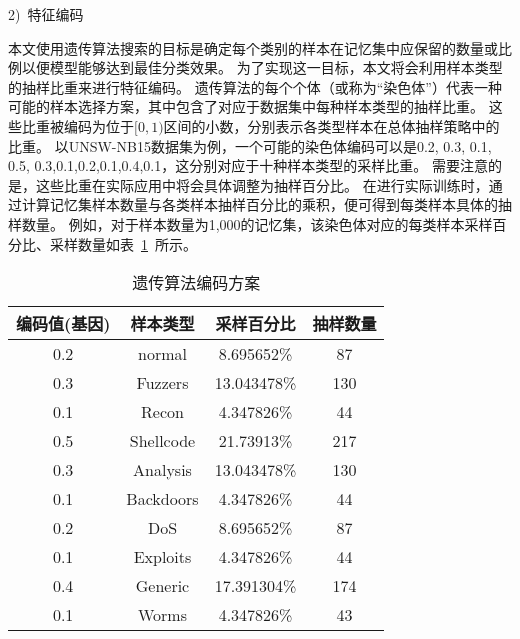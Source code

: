 2)~特征编码\par
本文使用遗传算法搜索的目标是确定每个类别的样本在记忆集中应保留的数量或比例以便模型能够达到最佳分类效果。
为了实现这一目标，本文将会利用样本类型的抽样比重来进行特征编码。
遗传算法的每个个体（或称为“染色体”）代表一种可能的样本选择方案，其中包含了对应于数据集中每种样本类型的抽样比重。
这些比重被编码为位于$[0,1)$区间的小数，分别表示各类型样本在总体抽样策略中的比重。
以UNSW-NB15数据集为例，一个可能的染色体编码可以是{0.2, 0.3, 0.1, 0.5, 0.3,0.1,0.2,0.1,0.4,0.1}，这分别对应于十种样本类型的采样比重。
需要注意的是，这些比重在实际应用中将会具体调整为抽样百分比。
在进行实际训练时，通过计算记忆集样本数量与各类样本抽样百分比的乘积，便可得到每类样本具体的抽样数量。
例如，对于样本数量为1,000的记忆集，该染色体对应的每类样本采样百分比、采样数量如表~\ref{tab:Ga_code}~所示。\par

\begin{table}
	\caption{遗传算法编码方案}
	\label{tab:Ga_code}
	\centering
	\begin{tabular}{cccc}
		\toprule
		\textbf{编码值(基因)} & \textbf{样本类型} & \textbf{采样百分比} & \textbf{抽样数量} \\
		\midrule
		0.2                   & normal            & 8.695652\%          & 87                \\
		0.3                   & Fuzzers           & 13.043478\%         & 130               \\
		0.1                   & Recon             & 4.347826\%          & 44                \\
		0.5                   & Shellcode         & 21.73913\%          & 217               \\
		0.3                   & Analysis          & 13.043478\%         & 130               \\
		0.1                   & Backdoors         & 4.347826\%          & 44                \\
		0.2                   & DoS               & 8.695652\%          & 87                \\
		0.1                   & Exploits          & 4.347826\%          & 44                \\
		0.4                   & Generic           & 17.391304\%         & 174               \\
		0.1                   & Worms             & 4.347826\%          & 43                \\
		\bottomrule
	\end{tabular}
\end{table}

